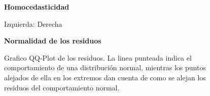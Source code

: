 \begin{figure}[h]
	\centering
	\textbf{Homocedasticidad}\par\medskip

	\caption[Homocedasticidad]{Izquierda: Derecha}\label{fig11}
\end{figure}




\begin{figure}[h]
	\centering
	\textbf{Normalidad de los residuos}\par\medskip
	\caption{Grafico QQ-Plot de los residuos. La linea punteada indica el comportamiento de una distribución normal, mientras los puntos alejados de ella en los extremos dan cuenta de como se alejan los residuos del comportamiento normal.}
\end{figure}\label{fig12}

